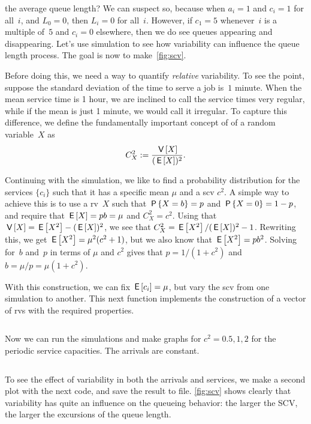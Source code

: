 \documentclass[stochastic-or.tex]{subfiles}
\begin{document}
 the average queue length?
We can suspect so, because when $a_{i}=1$ and $c_{i}=1$ for all~$i$, and $L_{0} = 0$,  then $L_{i} = 0$ for all~$i$.
However, if $c_{1}=5$ whenever~$i$ is a multiple of~$5$ and $c_{i}=0$ elsewhere, then we do see queues appearing and disappearing.
Let's use simulation to see how variability can influence the queue length process. The goal is now  to make~\cref{fig:scv}.

Before doing this, we need a way to quantify \emph{relative }variability.
To see the point, suppose the standard deviation of the time to serve a job is~$1$ minute.
When the mean service time is 1 hour, we are inclined to call the service times very regular, while if the mean is just 1 minute, we would call it irregular.
To capture this difference, we define the fundamentally important concept of  of a random variable~$X$  as
\begin{equation*}
 C^2_{X}:= \frac{\V X}{(\E X)^2}.
\end{equation*}


Continuing with the simulation, we like to find a probability distribution for the services $\{c_{i}\}$ such that it has a specific mean $\mu$ and a scv $c^{2}$.
A simple  way to achieve this is to use a rv~$X$ such that $\P{X=b} = p$ and $\P{X=0} = 1-p$, and require that $\E X = p b= \mu$ and $C^2_X = c^{2}$.
Using that $\V X = \E{X^{2}} - (\E X)^{2}$, we see that $C^{2}_{X} = \E{X^{2}}/(\E X)^{2} - 1$.
Rewriting this, we get $\E{X^{2}} = \mu^{2}(c^2+1)$, but we also know that $\E{X^{2}} = p b^{2}$.
Solving for~$b$ and~$p$ in terms of $\mu$ and $c^{2}$ gives that $p = 1 / (1 + c^{2})$ and $b=\mu/p = \mu (1+c^{2})$.


With this construction, we can fix $\E{c_{i}}=\mu$, but vary the scv from one simulation to another.
This next function implements the construction of a vector of rvs with the required properties.
\inputminted[firstline=92, lastline=98]{python}{../code/discrete_simulations.py} %

Now we can run the simulations and make graphs for $c^2=0.5, 1, 2$ for the periodic service capacities. The arrivals are constant.
\inputminted[firstline=105, lastline=117]{python}{../code/discrete_simulations.py} %

To see the effect of variability in both the arrivals and services, we make a second plot with the next code, and save the result to file.
\cref{fig:scv} shows clearly that variability has quite an influence on the queueing behavior: the larger the SCV, the larger the excursions of the queue length.
\inputminted[firstline=121, lastline=130]{python}{../code/discrete_simulations.py} %
\end{document}
